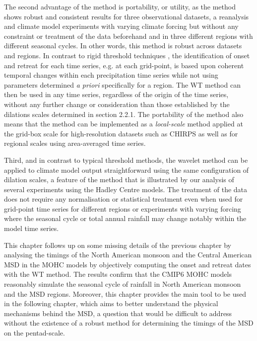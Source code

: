 The second advantage of the method is portability, or utility, as the method shows robust and consistent results for three observational datasets, a reanalysis and climate model experiments with varying climate forcing but without any constraint or treatment of the data beforehand and in three different regions with different seasonal cycles. In other words, this method is robust across datasets and regions. In contrast to rigid threshold techniques \citep[e.g.][]{liebmann2001interannual}, the identification of onset and retreat for each time series, e.g. at each grid-point, is based upon coherent temporal changes within each precipitation time series while not using parameters determined \textit{a priori} specifically for a region. The WT method can then be used in any time series, regardless of the origin of the time series, without any further change or consideration than those established by the dilations scales determined in section 2.2.1. 
The portability of the method also means that the method can be implemented as a \textit{local-scale} method applied at the grid-box scale for high-resolution datasets such as CHIRPS as well as for regional scales using area-averaged time series.

Third, and in contrast to typical threshold methods, the wavelet method can be applied to climate model output straightforward using the same configuration of dilation scales, a feature of the method that is illustrated by our analysis of several experiments using the Hadley Centre models. The treatment of the data does not require  any normalisation or statistical treatment even when used for grid-point time series for different regions or experiments with varying forcing where the seasonal cycle or total annual rainfall may change notably within the model time series.


This chapter follows up on some missing details of the previous chapter by analysing the timings  of the North American monsoon and the Central American MSD in the MOHC models by objectively computing the onset and retreat dates with the WT method. The results confirm that the CMIP6 MOHC models reasonably simulate the seasonal cycle of rainfall in North American monsoon and the MSD regions.
Moreover, this chapter provides the main tool to be used in the following chapter, which aims to better understand the physical mechanisms behind the MSD, a question that would be difficult to address without the existence of a robust method for determining the timings of the MSD on the pentad-scale.

